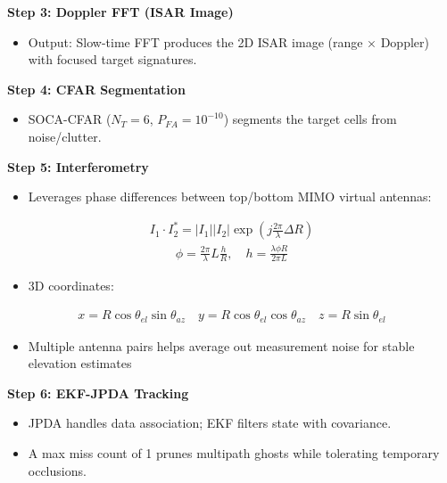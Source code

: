 \documentclass[a0paper,portrait]{tikzposter}
\begin{document}
\begin{columns}
\begin{subcolumns}
{\begin{minipage}{\linewidth}
    \textbf{Step 3: Doppler FFT (ISAR Image)}
    \begin{itemize}
        \setlength\itemsep{0.5mm}
        \item Output: Slow-time FFT produces the 2D ISAR image (range × Doppler) with focused target signatures.
    \end{itemize}
    \vspace{1mm}
    \textbf{Step 4: CFAR Segmentation}
    \begin{itemize}
        \setlength\itemsep{0.5mm}
        \item SOCA-CFAR ($N_T=6$, $P_{FA}=10^{-10}$) segments the target cells from noise/clutter.
    \end{itemize}
    \vspace{1mm}
    \textbf{Step 5: Interferometry}
    \begin{itemize}
        \setlength\itemsep{0.5mm}
        \item Leverages phase differences between top/bottom MIMO virtual antennas:
    \end{itemize}
    \begin{align*}
        I_1 \cdot I_2^* = |I_1||I_2| \exp\left(j\frac{2\pi}{\lambda}\Delta R\right)
    \end{align*}
    \begin{align*}
        \phi = \frac{2\pi}{\lambda} L\frac{h}{R}, \quad h = \frac{\lambda \phi R}{2\pi L}
    \end{align*}
    \begin{itemize}
        \setlength\itemsep{0.5mm}
        \item 3D coordinates:
    \end{itemize}
    \begin{align*}
        x = R\cos\theta_{el}\sin\theta_{az} \quad y = R\cos\theta_{el}\cos\theta_{az} \quad z = R\sin\theta_{el}
    \end{align*}
    \begin{itemize}
        \setlength\itemsep{0.5mm}
        \item Multiple antenna pairs helps average out measurement noise for stable elevation estimates
    \end{itemize}
    \vspace{1mm}
    \textbf{Step 6: EKF-JPDA Tracking}
    \begin{itemize}
        \setlength\itemsep{0.5mm}
        \item JPDA handles data association; EKF filters state with covariance.
        \item A max miss count of 1 prunes multipath ghosts while tolerating temporary occlusions.
    \end{itemize}
    \end{minipage}
    }


\end{subcolumns}
\end{columns}
\end{document}
